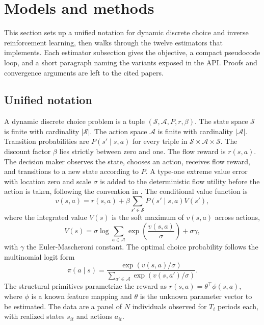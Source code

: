 \section{Models and methods} \label{sec:methods}

This section sets up a unified notation for dynamic discrete choice and inverse reinforcement learning, then walks through the twelve estimators that  implements. Each estimator subsection gives the objective, a compact pseudocode loop, and a short paragraph naming the variants exposed in the API. Proofs and convergence arguments are left to the cited papers.

\subsection{Unified notation}

A dynamic discrete choice problem is a tuple $(\mathcal{S}, \mathcal{A}, P, r, \beta)$. The state space $\mathcal{S}$ is finite with cardinality $|\mathcal{S}|$. The action space $\mathcal{A}$ is finite with cardinality $|\mathcal{A}|$. Transition probabilities are $P(s' \mid s, a)$ for every triple in $\mathcal{S} \times \mathcal{A} \times \mathcal{S}$. The discount factor $\beta$ lies strictly between zero and one. The flow reward is $r(s, a)$. The decision maker observes the state, chooses an action, receives flow reward, and transitions to a new state according to $P$. A type-one extreme value error with location zero and scale $\sigma$ is added to the deterministic flow utility before the action is taken, following the convention in \citet{rust1987}. The conditional value function is
\begin{equation}
v(s, a) = r(s, a) + \beta \sum_{s' \in \mathcal{S}} P(s' \mid s, a) V(s'),
\label{eq:v}
\end{equation}
where the integrated value $V(s)$ is the soft maximum of $v(s, a)$ across actions,
\begin{equation}
V(s) = \sigma \log \sum_{a \in \mathcal{A}} \exp\left(\frac{v(s, a)}{\sigma}\right) + \sigma \gamma,
\label{eq:V}
\end{equation}
with $\gamma$ the Euler-Mascheroni constant. The optimal choice probability follows the multinomial logit form
\begin{equation}
\pi(a \mid s) = \frac{\exp(v(s, a) / \sigma)}{\sum_{a' \in \mathcal{A}} \exp(v(s, a') / \sigma)}.
\label{eq:pi}
\end{equation}
The structural primitives parametrize the reward as $r(s, a) = \theta^\top \phi(s, a)$, where $\phi$ is a known feature mapping and $\theta$ is the unknown parameter vector to be estimated. The data are a panel of $N$ individuals observed for $T_i$ periods each, with realized states $s_{it}$ and actions $a_{it}$.

